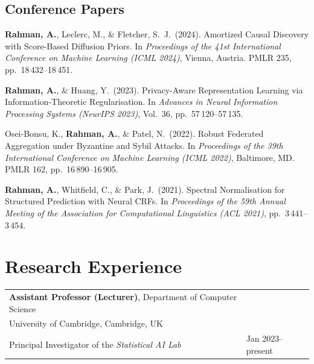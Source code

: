 \documentclass[a4paper,11pt]{article}
\makeatletter
\newcommand{\cventry}[2]{%
  \begin{tabularx}{\linewidth}{@{}X@{\hspace{4pt}}>{\raggedleft\arraybackslash}p{4.6cm}@{}}
    #1 & #2 \\
  \end{tabularx}%
}
\newcommand{\me}[1]{\textbf{#1}}
\makeatother
\begin{document}
\vspace{6pt}
\subsection*{\normalsize\color{accent} Conference Papers}
\vspace{2pt}

\begin{enumerate}[leftmargin=*, label={[\arabic*]}, itemsep=4pt,
                  start=5]

\item \me{Rahman, A.}, Leclerc, M., \& Fletcher, S.~J.\ (2024).
  Amortized Causal Discovery with Score-Based Diffusion Priors.
  In \textit{Proceedings of the 41st International Conference on Machine Learning
  (ICML 2024)}, Vienna, Austria. PMLR 235, pp.~18\,432--18\,451.

\item \me{Rahman, A.}, \& Huang, Y.\ (2023).
  Privacy-Aware Representation Learning via Information-Theoretic Regularisation.
  In \textit{Advances in Neural Information Processing Systems (NeurIPS 2023)},
  Vol.~36, pp.~57\,120--57\,135.

\item Osei-Bonsu, K., \me{Rahman, A.}, \& Patel, N.\ (2022).
  Robust Federated Aggregation under Byzantine and Sybil Attacks.
  In \textit{Proceedings of the 39th International Conference on Machine Learning
  (ICML 2022)}, Baltimore, MD. PMLR 162, pp.~16\,890--16\,905.

\item \me{Rahman, A.}, Whitfield, C., \& Park, J.\ (2021).
  Spectral Normalisation for Structured Prediction with Neural CRFs.
  In \textit{Proceedings of the 59th Annual Meeting of the Association for
  Computational Linguistics (ACL 2021)}, pp.~3\,441--3\,454.

\end{enumerate}

\section{Research Experience}

\cventry{%
  \textbf{Assistant Professor (Lecturer)}, Department of Computer Science\\
  University of Cambridge, Cambridge, UK\\
  Principal Investigator of the \textit{Statistical AI Lab}
}{Jan 2023--present}
\end{document}
